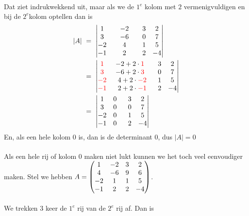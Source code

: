  Dat ziet indrukwekkend uit, maar als we de $ 1^e $ kolom met $2$ vermenigvuldigen en bij de $ 2^e  $kolom optellen dan is \\
	\begin{align*}
	|A|  \  & = \ \begin{vmatrix}  1 & & -2 &  & 3 & 2  \\  3 & & -6 & &  0 & 7  \\  -2 & & 4 & &  1 & 5  \\  -1 & & 2 & &  2 & -4 \end{vmatrix} \\
	\  & = \ \begin{vmatrix}  {\color{red}1} & -2+2\cdot {\color{red}1} &  \ \ 3 & 2  \\  {\color{red}3} & -6+2\cdot {\color{red}3} &  \ \ 0 & 7  \\  {\color{red}-2} & \ \ 4+2\cdot {\color{red}-2} &  \ \ 1 & 5  \\  {\color{red}-1} & \ \  2+2\cdot {\color{red}-1} &  \ \ 2 & -4 \end{vmatrix} \\
	\ & = \ \begin{vmatrix}  1 & 0 &  \ \ 3 & 2  \\  3 & 0 &  \ \ 0 & 7  \\  -2 & 0 &  \ \ 1 & 5  \\  -1 & 0 &  \ \ 2 & -4 \end{vmatrix} 
	\end{align*} 
	En, als een hele kolom $0$ is, dan is de determinant $0$, dus $ |A| = 0 $ 	 \\   \\                    
\newpage
Als een hele rij of kolom $0$ maken niet lukt kunnen we het toch veel eenvoudiger maken. 
	Stel we hebben 
	$ A = \begin{pmatrix}  1 & -2 & 3 & 2  \\  4 & -6 & 9 & 6  \\  -2 & 1 & 1 & 5  \\  -1 & 2 & 2 & -4  \end{pmatrix} $. \\ \\
 We trekken $3$ keer de $ 1^e  $ rij van de  $ 2^e $ rij af. Dan is 
